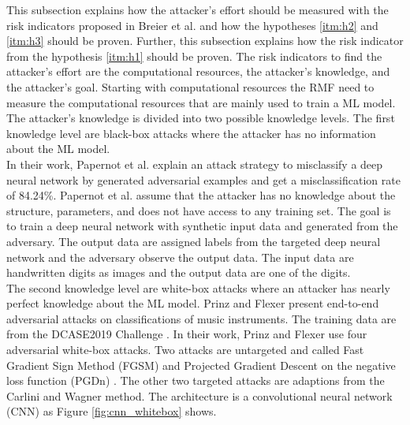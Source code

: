 This subsection explains how the attacker's effort should be measured with the risk indicators proposed in Breier et al. \cite{DBLP:journals/corr/abs-2012-04884} and how the hypotheses \ref{itm:h2} and
\ref{itm:h3} should be proven. Further, this subsection explains how the risk indicator from the hypothesis \ref{itm:h1} should be proven. The risk indicators to find the attacker's effort are the
computational resources, the attacker's knowledge, and the attacker's goal. Starting with computational resources the RMF need to measure the computational resources that are mainly used to train a ML
model. The attacker's knowledge is divided into two possible knowledge levels. The first knowledge level are black-box attacks where the attacker has no information about the ML model. \\ In their
work, Papernot et al. \cite{DBLP:conf/ccs/PapernotMGJCS17} explain an attack strategy to misclassify a deep neural network by generated adversarial examples and get a misclassification rate of 84.24\%.
Papernot et al. assume that the attacker has no knowledge about the structure, parameters, and does not have access to any training set. The goal is to train a deep neural network with synthetic input
data and generated from the adversary. The output data are assigned labels from the targeted deep neural network and the adversary observe the output data. The input data are handwritten digits as
images and the output data are one of the digits. \\ The second knowledge level are white-box attacks where an attacker has nearly perfect knowledge about the ML model. Prinz and Flexer
\cite{DBLP:journals/corr/abs-2007-14714} present end-to-end adversarial attacks on classifications of music instruments. The training data are from the DCASE2019 Challenge \cite{DBLP:conf/dcase/
FonsecaPFES19}. In their work, Prinz and Flexer use four adversarial white-box attacks. Two attacks are untargeted and called Fast Gradient Sign Method (FGSM) \cite{DBLP:journals/corr/GoodfellowSS14} and Projected Gradient Descent on the negative loss function (PGDn) \cite{DBLP:conf/iclr/MadryMSTV18}. The other two targeted attacks are adaptions from the  Carlini and Wagner \cite{DBLP:conf/sp/Carlini018} method. The architecture is a convolutional neural network (CNN) as Figure \ref{fig:cnn_whitebox} shows.

